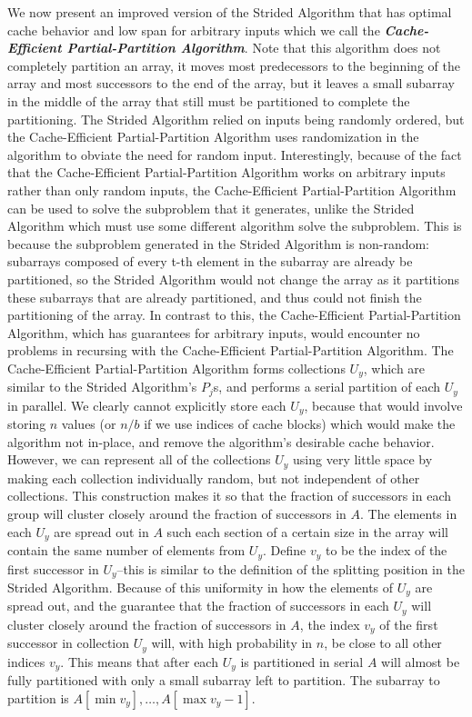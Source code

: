 \documentclass[sigconf]{acmart}
\newcommand{\defn}[1]       {{\textit{\textbf{\boldmath #1}}}}
\renewcommand{\paragraph}[1]{\vspace{0.09in}\noindent{\bf \boldmath #1.}}
\theoremstyle{remark}
\theoremstyle{remark}
\begin{document}
\paragraph{Algorithm Concept}
We now present an improved version of the Strided Algorithm that has optimal cache behavior and low span for arbitrary inputs which we call the \defn{Cache-Efficient Partial-Partition Algorithm}. 
Note that this algorithm does not completely partition an array, it moves most predecessors to the beginning of the array and most successors to the end of the array, but it leaves a small subarray in the middle of the array that still must be partitioned to complete the partitioning.
The Strided Algorithm relied on inputs being randomly ordered, but the Cache-Efficient Partial-Partition Algorithm uses randomization in the algorithm to obviate the need for random input. 
Interestingly, because of the fact that the Cache-Efficient Partial-Partition Algorithm works on arbitrary inputs rather than only random inputs, the Cache-Efficient Partial-Partition Algorithm can be used to solve the subproblem that it generates, unlike the Strided Algorithm which must use some different algorithm solve the subproblem.
This is because the subproblem generated in the Strided Algorithm is non-random: subarrays composed of every t-th element in the subarray are already be partitioned, so the Strided Algorithm would not change the array as it partitions these subarrays that are already partitioned, and thus could not finish the partitioning of the array.
In contrast to this, the Cache-Efficient Partial-Partition Algorithm, which has guarantees for arbitrary inputs, would encounter no problems in recursing with the Cache-Efficient Partial-Partition Algorithm.
The Cache-Efficient Partial-Partition Algorithm forms collections $U_y$, which are similar to the Strided Algorithm's $P_j$s, and performs a serial partition of each $U_y$ in parallel.
We clearly cannot explicitly store each $U_y$, because that would involve storing $n$ values (or $n/b$ if we use indices of cache blocks) which would make the algorithm not in-place, and remove the algorithm's desirable cache behavior. 
However, we can represent all of the collections $U_y$ using very little space by making each collection individually random, but not independent of other collections. 
This construction makes it so that the fraction of successors in each group will cluster closely around the fraction of successors in $A$.
The elements in each $U_y$ are spread out in $A$ such each section of a certain size in the array will contain the same number of elements from $U_y$. 
Define $v_y$ to be the index of the first successor in $U_y$--this is similar to the definition of the splitting position in the Strided Algorithm.
Because of this uniformity in how the elements of $U_y$ are spread out, and the guarantee that the fraction of successors in each $U_y$ will cluster closely around the fraction of successors in $A$, the index $v_y$ of the first successor in collection $U_y$ will, with high probability in $n$, be close to all other indices $v_y$.
This means that after each $U_y$ is partitioned in serial $A$ will almost be fully partitioned with only a small subarray left to partition.
The subarray to partition is $A[\min{v_y}], \ldots, A[\max{v_y}-1]$.
\end{document}
